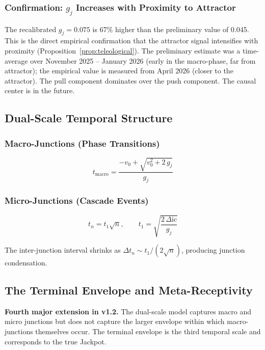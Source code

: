 \documentclass[12pt,a4paper]{article}
\newcommand{\gj}{g_j}
\begin{document}
\subsubsection{Confirmation: $\gj$ Increases with Proximity to Attractor}

The recalibrated $\gj = 0.075$ is 67\% higher than the preliminary value of 0.045. This is the direct empirical confirmation that the attractor signal intensifies with proximity (Proposition~\ref{prop:teleological}). The preliminary estimate was a time-average over November 2025 -- January 2026 (early in the macro-phase, far from attractor); the empirical value is measured from April 2026 (closer to the attractor). The pull component dominates over the push component. The causal center is in the future.

\subsection{Dual-Scale Temporal Structure}

\subsubsection{Macro-Junctions (Phase Transitions)}

\begin{equation}\label{eq:macro}
t_{\text{macro}} = \frac{-v_0 + \sqrt{v_0^2 + 2\,\gj}}{\gj}
\end{equation}

\subsubsection{Micro-Junctions (Cascade Events)}

\begin{equation}\label{eq:micro}
t_n = t_1 \sqrt{n}, \qquad t_1 = \sqrt{\frac{2\,\Delta\mathrm{ic}}{\gj}}
\end{equation}

The inter-junction interval shrinks as $\Delta t_n \sim t_1 / (2\sqrt{n})$, producing junction condensation.

\subsection{The Terminal Envelope and Meta-Receptivity}\label{subsec:terminal}

\textbf{Fourth major extension in v1.2.} The dual-scale model captures macro and micro junctions but does not capture the larger envelope within which macro-junctions themselves occur. The terminal envelope is the third temporal scale and corresponds to the true Jackpot.
\end{document}
